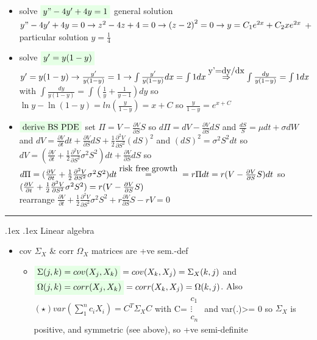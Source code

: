 \documentclass[10pt,landscape,a4paper]{article}
\makeatletter
\let\displaystyle\textstyle
\renewcommand{\section}{\@startsection{section}{1}{0mm}%
                                {.1ex}%
                                {.1ex}%
                                {\color{blue}\sffamily\small\bfseries}}
\newcommand\myeq[1]{\stackrel{{\normalfont\mbox{#1}}}{ = }}
\newcommand\myright[1]{\stackrel{{\normalfont\mbox{#1}}}{ \Rightarrow }}
\newcommand{\myhighlight}[1]{\colorbox{green!10}{$\displaystyle #1$}}
\makeatother
\begin{document}
\begin{multicols*}{4}
\begin{spacing}{0.1}
\begin{itemize}
\item solve $ \myhighlight{ y" - 4y'+4y=1} $ general solution $y"-4y'+4y=0 \rightarrow z^2-4z+4=0 \rightarrow {(z-2)}^2=0 \rightarrow y=C_1e^{2x}+C_2 x e^{2x} $ + particular solution $y=\frac{1}{4}$ 
	
\item solve $ \myhighlight{ y'= y (1-y)} $ $y'= y (1-y) \rightarrow \frac{y'}{y(1-y)}=1 \rightarrow \int \frac{y'}{y(1-y)} dx =\int 1 dx \myright {y'=dy/dx} \int \frac{dy}{y(1-y)}=\int 1 dx $ with $\int \frac{dy}{y(1-y)} = \int (\frac{1}{y} + \frac{1}{y-1}) dy $ so $\ln y - \ln (1-y) = ln (\frac{y}{1-y}) = x +C$ so $\frac{y}{1-y}=e^{x+C}$

\item $ \myhighlight{ \text{derive BS PDE}} $ set $\Pi=V-\frac{\partial V}{\partial S}S$ so $d\Pi = dV -\frac{\partial V}{\partial S} dS $ and $\frac{dS}{S}=\mu dt + \sigma dW$ and $dV=\frac{\partial V}{\partial t}dt + \frac{\partial V}{\partial S}dS + \frac{1}{2} \frac{\partial^2 V}{\partial S^2} {(dS)}^2$ and ${(dS)}^2=\sigma^2 S^2 dt$ so $dV = ( \frac{\partial V}{\partial t}+ \frac{1}{2} \frac{\partial^2 V}{\partial S^2} \sigma^2 S^2) dt + \frac{\partial V}{\partial S}dS $ so $d\Pi \\= ( \frac{\partial V}{\partial t}+ \frac{1}{2} \frac{\partial^2 V}{\partial S^2} \sigma^2 S^2) dt \myeq{risk free growth} \\= r \Pi dt \\= r (V-\frac{\partial V}{\partial S}S)dt $ so $( \frac{\partial V}{\partial t}+ \frac{1}{2} \frac{\partial^2 V}{\partial S^2} \sigma^2 S^2) \\= r(V-\frac{\partial V}{\partial S}S) $ \\ rearrange $ \frac{\partial V}{\partial t}+ \frac{1}{2} \frac{\partial^2 V}{\partial S^2} \sigma^2 S^2 + r \frac{\partial V}{\partial S}S - rV =0 $
\end{itemize}
\hrule
\section {Linear algebra}
\begin{itemize}
\item \colorbox{green!10}{cov $\Sigma_X$ \& corr $\Omega_X$ matrices are +ve sem.-def}
\begin{itemize}

\item  $ \myhighlight{ \Sigma(j,k)=cov(X_j,X_k) }=cov(X_k,X_j)=\Sigma_X(k,j)$ and $\myhighlight{ \Omega(j,k)=corr(X_j,X_k) } =corr(X_k,X_j)=\Omega(k,j)$. Also $(\star) var(\sum_1^n c_iX_i)=C^T \Sigma_X C$  with C=$\begin{array}{c} c_1 \\ \vdots \\ c_n \end{array}$ and var(.)>= 0 so $\Sigma_X$ is positive, and symmetric (see above), so +ve semi-definite


\end{itemize}
\end{itemize}
\end{spacing}
\end{multicols*}
\end{document}
